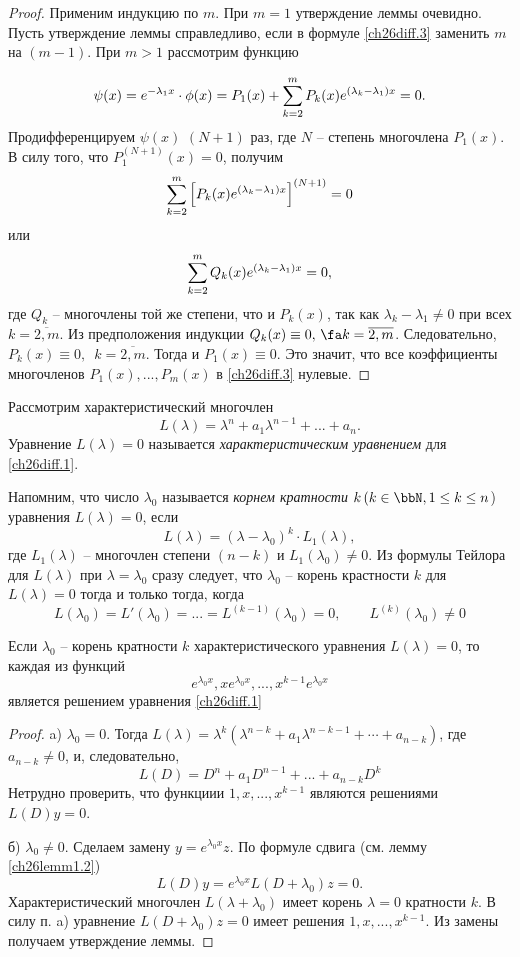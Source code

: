 \begin{proof}
Применим индукцию по $m$. При $m=1$ утверждение леммы очевидно. Пусть утверждение леммы справледливо, если в формуле \eqref{ch26diff.3} заменить $m$ на $(m-1)$. При $m>1$ рассмотрим функцию

$$
\psi(x)=e^{-\lambda_1x}\cdot\phi(x)=P_1(x)+ \sum_{k=2}^{m}\limits P_k(x)e^{(\lambda_k-\lambda_1)x}=0.
$$
Продифференцируем $\psi(x)$ $(N+1)$ раз, где $N$ -- степень многочлена $P_1(x)$. В силу того, что $P_1^{(N+1)}(x)=0$, получим 
$$
\sum_{k=2}^{m}\limits\left[P_k(x)e^{(\lambda_k-\lambda_1)x}\right]^{(N+1)}=0
$$
или
$$
\sum_{k=2}^{m}\limits Q_k(x)e^{(\lambda_k-\lambda_1)x}=0,
$$
где $Q_k$ -- многочлены той же степени, что и $P_k(x)$, так как $\lambda_k-\lambda_1 \neq 0$ при всех $k=\overline{2,m}$. Из предположения индукции $Q_k(x)\equiv 0,\,\fa k=\overline{2,m}$. Следовательно, $P_k(x)\equiv 0,\,$ $k=\overline{2,m}$. Тогда и $P_1(x)\equiv 0$. Это значит, что все коэффициенты многочленов $P_1(x),...,P_m(x)$ в \eqref{ch26diff.3} нулевые.
\end{proof}

Рассмотрим характеристический многочлен
$$
L(\lambda)=\lambda^n+a_1\lambda^{n-1}+...+a_n.
$$
Уравнение $L(\lambda)=0$ называется \textit{характеристическим уравнением} для \eqref{ch26diff.1}.

Напомним, что число $\lambda_0$ называется \textit{корнем кратности} $k\,(k\in\bbN, 1\leq k \leq n$) уравнения $L(\lambda)=0$, если
$$
L(\lambda)=(\lambda-\lambda_0)^k\cdot L_1(\lambda),
$$
где $L_1(\lambda)$ -- многочлен степени $(n-k)$ и $L_1(\lambda_0)\neq 0$. Из формулы Тейлора для $L(\lambda)$ при $\lambda=\lambda_0$ сразу следует, что  $\lambda_0$ -- корень крастности $k$ для $L(\lambda)=0$ тогда и только тогда, когда
$$
L(\lambda_0)=L'(\lambda_0)=...=L^{(k-1)}(\lambda_0)=0, \qquad L^{(k)}(\lambda_0)\neq 0
$$




\begin{lemm} \label{ch26lemm2.3}
Если $\lambda_0$ -- корень кратности $k$ характеристического уравнения $L(\lambda)=0$, то каждая из функций 
$$
e^{\lambda_0 x},xe^{\lambda_0 x},...,x^{k-1}e^{\lambda_0 x}
$$
является решением уравнения \eqref{ch26diff.1}
\end{lemm}

\begin{proof}

a) $\lambda_0=0$. Тогда $L(\lambda)=\lambda^k(\lambda^{n-k}+a_1\lambda^{n-k-1}+\cdots+a_{n-k})$, где  $a_{n-k}\neq 0$, и, следовательно,
$$
L(D)=D^n+a_1D^{n-1}+...+a_{n-k}D^k
$$
Нетрудно проверить, что функциии $1,x,...,x^{k-1}$ являются решениями $L(D)y=0$.

б) $\lambda_0\neq 0$. Сделаем замену $y=e^{\lambda_0x}z$. По формуле сдвига (см. лемму \ref{ch26lemm1.2})
$$
L(D)y=e^{\lambda_0x}L(D+\lambda_0)z=0.
$$
Характеристический многочлен $L(\lambda+\lambda_0)$ имеет корень $\lambda=0$ кратности $k$. В силу п. a) уравнение $L(D+\lambda_0)z=0$ имеет решения $1,x,...,x^{k-1}$. Из замены получаем утверждение леммы.
\end{proof}


